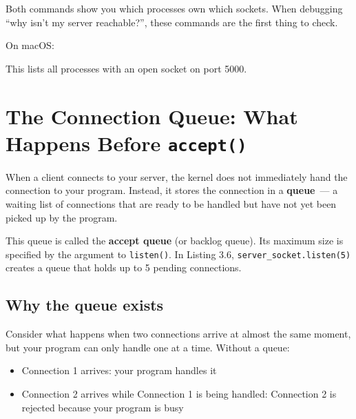 \noindent{}Both commands show you which processes own which sockets. When debugging ``why isn't my server reachable?'', these commands are the first thing to check.

On macOS:

\begin{codebox}[short]

\begin{Shaded}
\begin{Highlighting}[]
 
\end{Highlighting}
\end{Shaded}

\end{codebox}

\noindent{}This lists all processes with an open socket on port 5000.

\setcounter{section}{5}
\section{\texorpdfstring{The Connection Queue: What Happens Before \texttt{accept()}}{The Connection Queue: What Happens Before accept()}}\label{03-network-capability:36-the-connection-queue-what-happens-before-accept}

When a client connects to your server, the kernel does not immediately hand the connection to your program. Instead, it stores the connection in a \textbf{queue}~--- a waiting list of connections that are ready to be handled but have not yet been picked up by the program.

This queue is called the \textbf{accept queue} (or backlog queue). Its maximum size is specified by the argument to \texttt{listen()}. In Listing 3.6, \texttt{server\_socket.listen(5)} creates a queue that holds up to 5 pending connections.

\subsection*{Why the queue exists}\label{03-network-capability:why-the-queue-exists}

Consider what happens when two connections arrive at almost the same moment, but your program can only handle one at a time. Without a queue:

\begin{itemize}
\tightlist
\item
  Connection 1 arrives: your program handles it
\item
  Connection 2 arrives while Connection 1 is being handled: Connection 2 is rejected because your program is busy
\end{itemize}

